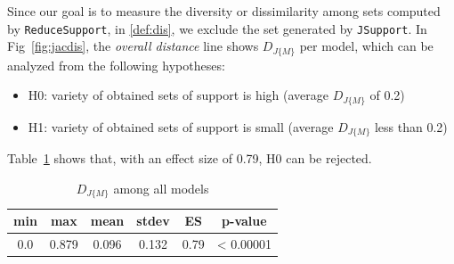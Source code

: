 Since our goal is to measure the diversity or dissimilarity among sets computed by \texttt{ReduceSupport}, in \ref{def:dis}, we exclude the set generated by \texttt{JSupport}. In Fig~\ref{fig:jacdis}, the \emph{overall distance} line shows $D_{J\{M\}}$ per model, which can be analyzed from the following hypotheses:
\begin{itemize}
  \item H0: variety of obtained sets of support is high (average $D_{J\{M\}}$ of 0.2)
  \item H1: variety of obtained sets of support is small (average $D_{J\{M\}}$ less than 0.2)
\end{itemize}
Table~\ref{tab:variety} shows that, with an effect size of 0.79, H0 can be rejected.
\begin{table}
  \centering
  \begin{tabular}{ |c|c|c|c|c|c| }
    \hline
     min & max & mean & stdev & ES & p-value\\[0.5ex]
    \hline
     0.0   & 0.879 & 0.096 & 0.132 & 0.79 & < 0.00001 \\[0.5ex]
    \hline
  \end{tabular}
  \caption{$D_{J\{M\}}$ among all models}
  \label{tab:variety}
\end{table}


\vspace{6pt}
\noindent{}
 \vspace{6pt}

